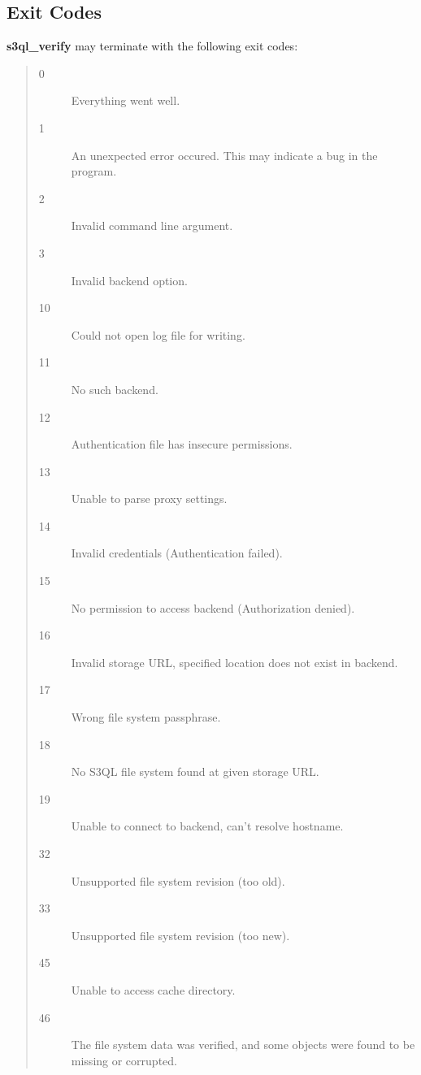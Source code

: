 \documentclass[letterpaper,10pt,english]{sphinxmanual}
\begin{document}
\subsection{Exit Codes}
\label{man/verify:exit-codes}
\textbf{s3ql\_verify} may terminate with the following exit codes:
\begin{quote}\begin{description}
\item[{0}] \leavevmode
Everything went well.

\item[{1}] \leavevmode
An unexpected error occured. This may indicate a bug in the
program.

\item[{2}] \leavevmode
Invalid command line argument.

\item[{3}] \leavevmode
Invalid backend option.

\item[{10}] \leavevmode
Could not open log file for writing.

\item[{11}] \leavevmode
No such backend.

\item[{12}] \leavevmode
Authentication file has insecure permissions.

\item[{13}] \leavevmode
Unable to parse proxy settings.

\item[{14}] \leavevmode
Invalid credentials (Authentication failed).

\item[{15}] \leavevmode
No permission to access backend (Authorization denied).

\item[{16}] \leavevmode
Invalid storage URL, specified location does not exist in backend.

\item[{17}] \leavevmode
Wrong file system passphrase.

\item[{18}] \leavevmode
No S3QL file system found at given storage URL.

\item[{19}] \leavevmode
Unable to connect to backend, can't resolve hostname.

\item[{32}] \leavevmode
Unsupported file system revision (too old).

\item[{33}] \leavevmode
Unsupported file system revision (too new).

\item[{45}] \leavevmode
Unable to access cache directory.

\item[{46}] \leavevmode
The file system data was verified, and some objects were found
to be missing or corrupted.

\end{description}\end{quote}
\end{document}
